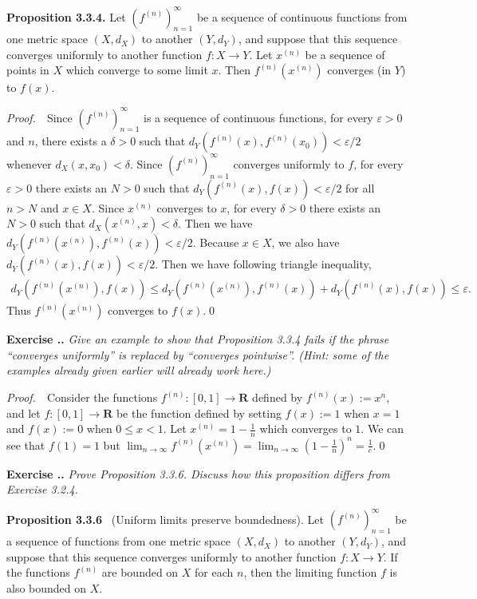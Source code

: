\documentclass{book}
\newcommand{\pff}{\vspace{.25em}\noindent\emph{Proof.}~~}
\newcommand{\titl}[1]{\noindent\textbf{#1}}
\newcounter{Exercise}[section]
\renewcommand{\theExercise}{\thesection.\arabic{Exercise}.}
\newcommand{\new}{\vspace{1.5em}\noindent\textbf{Exercise \stepcounter{Exercise}\textbf{\theExercise}} }
\begin{document}
\begin{framed}
\titl{Proposition 3.3.4.} Let $(f^{(n)})_{n = 1}^{\infty}$ be a sequence of continuous functions from one metric space $(X, d_X)$ to another $(Y, d_Y)$, and suppose that this sequence converges uniformly to another function $f : X \to Y$. Let $x^{(n)}$ be a sequence of points in $X$ which converge to some limit $x$. Then $f^{(n)}(x^{(n)})$ converges (in $Y$) to $f(x)$.
\end{framed}

\pff Since $(f^{(n)})_{n = 1}^{\infty}$ is a sequence of continuous functions, for every $\varepsilon > 0$ and $n$, there exists a $\delta > 0$ such that $d_Y(f^{(n)}(x), f^{(n)}(x_0)) < \varepsilon/2$ whenever $d_X(x, x_0) < \delta$. Since $(f^{(n)})_{n = 1}^{\infty}$ converges uniformly to $f$, for every $\varepsilon > 0$ there exists an $N > 0$ such that $d_Y(f^{(n)}(x), f(x)) < \varepsilon/2$ for all $n > N$ and $x \in X$. Since $x^{(n)}$ converges to $x$, for every $\delta > 0$ there exists an $N > 0$ such that $d_X(x^{(n)}, x) < \delta$. Then we have $d_Y(f^{(n)}(x^{(n)}), f^{(n)}(x)) < \varepsilon/2$. Because $x \in X$, we also have $d_Y(f^{(n)}(x), f(x)) < \varepsilon/2$. Then we have following triangle inequality,
    \begin{align*}
        d_Y(f^{(n)}(x^{(n)}), f(x))
        \leq d_Y(f^{(n)}(x^{(n)}), f^{(n)}(x)) + d_Y(f^{(n)}(x), f(x))
        \leq \varepsilon.
    \end{align*}
Thus $f^{(n)}(x^{(n)})$ converges to $f(x)$.\qed

\new\emph{Give an example to show that Proposition 3.3.4 fails if the phrase ``converges uniformly'' is replaced by ``converges pointwise''.
(Hint: some of the examples already given earlier will already work here.)}

\pff Consider the functions $f^{(n)} : [0, 1] \to \mathbf{R}$ defined by $f^{(n)}(x) := x^n$, and let $f : [0, 1] \to \mathbf{R}$ be the function defined by setting $f(x) := 1$ when $x = 1$ and $f(x) := 0$ when $0 \leq x < 1$. Let $x^{(n)} = 1 - \frac{1}{n}$ which converges to $1$. We can see that $f(1) = 1$ but $\lim_{n \to \infty}f^{(n)}(x^{(n)}) = \lim_{n \to \infty}(1 - \frac{1}{n})^n = \frac{1}{e}$.\qed

\new\emph{Prove Proposition 3.3.6. Discuss how this proposition differs from Exercise 3.2.4.}

\begin{framed}
\titl{Proposition 3.3.6}~ (Uniform limits preserve boundedness). Let $(f^{(n)})_{n = 1}^{\infty}$ be a sequence of functions from one metric space $(X, d_X)$ to another $(Y, d_Y)$, and suppose that this sequence converges uniformly to another function $f : X \to Y$. If the functions $f^{(n)}$ are bounded on $X$ for each $n$, then the limiting function $f$ is also bounded on $X$.
\end{framed}
\end{document}
